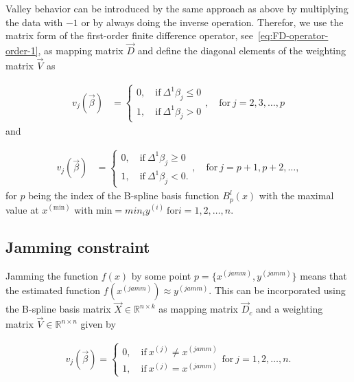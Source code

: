 \documentclass[10pt,a4paper]{report}
\begin{document}
Valley behavior can be introduced by the same approach as above by multiplying the data with $-1$ or by always doing the inverse operation. Therefor, we use the matrix form of the first-order finite difference operator, see~\ref{eq:FD-operator-order-1}, as mapping matrix $\vec{D}$ and define the diagonal elements of the weighting matrix $\vec{V}$ as

\begin{align}\label{eq:v_valley_1}
	v_j(\vec{\beta}) &= \begin{cases} 
		0, \quad \text{if} \ \Delta^1\beta_j \le 0 \\ 
		1, \quad \text{if} \ \Delta^1\beta_j > 0
	\end{cases}, \quad \text{for} \ j=2,3,\dots,p
\end{align}
%
and 

\begin{align}\label{eq:v_valley_2}
	v_j(\vec{\beta}) &= \begin{cases} 
		0, \quad \text{if} \ \Delta^1\beta_j \ge 0 \\ 
		1, \quad \text{if} \ \Delta^1\beta_j < 0.
	\end{cases}, \quad \text{for} \  j=p+1,p+2,\dots,
\end{align}
%
for $p$ being the index of the B-spline basis function $B_p^l(x)$ with the maximal value at $x^{(\text{min})}$ with $\text{min} = min_i y^{(i)} \ \text{for} i=1,2,\dots,n$. 

\subsection{Jamming constraint} \label{subsec:JammC}

Jamming the function $f(x)$ by some point $p = \{x^{(jamm)}, y^{(jamm)}\}$ means that the estimated function $f(x^{(jamm)}) \approx y^{(jamm)}$. This can be incorporated using the B-spline basis matrix $\vec{X} \in \mathbb{R}^{n \times k}$ as mapping matrix $\vec{D}_c$ and a weighting matrix $\vec{V} \in \mathbb{R}^{n \times n}$ given by

\begin{align} \label{eq:v_jamming}
	v_j(\vec{\beta}) = 
	\begin{cases}
		0, \quad \text{if} \ x^{(j)} \ne x^{(jamm)} \\
		1, \quad \text{if} \ x^{(j)} = x^{(jamm)} 
	\end{cases} \text{for} \ j = 1,2,\dots,n.
\end{align} 
\end{document}

